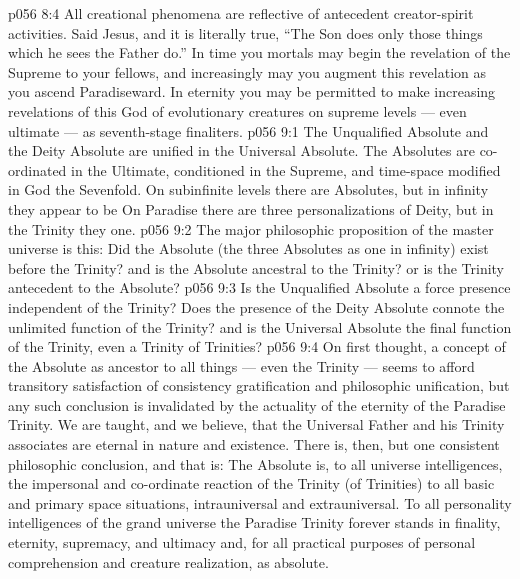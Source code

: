\vs p056 8:4 All creational phenomena are reflective of antecedent creator\hyp{}spirit activities. Said Jesus, and it is literally true, “The Son does only those things which he sees the Father do.” In time you mortals may begin the revelation of the Supreme to your fellows, and increasingly may you augment this revelation as you ascend Paradiseward. In eternity you may be permitted to make increasing revelations of this God of evolutionary creatures on supreme levels --- even ultimate --- as seventh\hyp{}stage finaliters.
\vs p056 9:1 The Unqualified Absolute and the Deity Absolute are unified in the Universal Absolute. The Absolutes are co\hyp{}ordinated in the Ultimate, conditioned in the Supreme, and time\hyp{}space modified in God the Sevenfold. On subinfinite levels there are  Absolutes, but in infinity they appear to be  On Paradise there are three personalizations of Deity, but in the Trinity they  one.
\vs p056 9:2 \pc The major philosophic proposition of the master universe is this: Did the Absolute (the three Absolutes as one in infinity) exist before the Trinity? and is the Absolute ancestral to the Trinity? or is the Trinity antecedent to the Absolute?
\vs p056 9:3 Is the Unqualified Absolute a force presence independent of the Trinity? Does the presence of the Deity Absolute connote the unlimited function of the Trinity? and is the Universal Absolute the final function of the Trinity, even a Trinity of Trinities?
\vs p056 9:4 On first thought, a concept of the Absolute as ancestor to all things --- even the Trinity --- seems to afford transitory satisfaction of consistency gratification and philosophic unification, but any such conclusion is invalidated by the actuality of the eternity of the Paradise Trinity. We are taught, and we believe, that the Universal Father and his Trinity associates are eternal in nature and existence. There is, then, but one consistent philosophic conclusion, and that is: The Absolute is, to all universe intelligences, the impersonal and co\hyp{}ordinate reaction of the Trinity (of Trinities) to all basic and primary space situations, intrauniversal and extrauniversal. To all personality intelligences of the grand universe the Paradise Trinity forever stands in finality, eternity, supremacy, and ultimacy and, for all practical purposes of personal comprehension and creature realization, as absolute.

